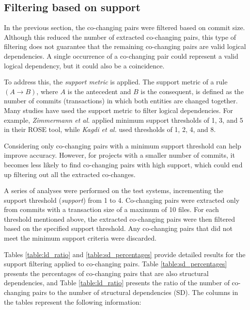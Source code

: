 \subsection{Filtering based on support}
\label{subsec:filtering_support}

\hspace{4em}In the previous section, the co-changing pairs were filtered based on commit size. Although this reduced the number of extracted co-changing pairs, this type of filtering does not guarantee that the remaining co-changing pairs are valid logical dependencies. A single occurrence of a co-changing pair could represent a valid logical dependency, but it could also be a coincidence.  

To address this, the \textit{support metric} is applied. The support metric of a rule $(A \rightarrow B)$, where $A$ is the antecedent and $B$ is the consequent, is defined as the number of commits (transactions) in which both entities are changed together. Many studies have used the support metric to filter logical dependencies. For example, \textit{Zimmermann et al.} \cite{Zimmermann:2004:MVH:998675.999460} applied minimum support thresholds of 1, 3, and 5 in their ROSE tool, while \textit{Kagdi et al.} \cite{article-Kagdi-commit} used thresholds of 1, 2, 4, and 8.

Considering only co-changing pairs with a minimum support threshold can help improve accuracy. However, for projects with a smaller number of commits, it becomes less likely to find co-changing pairs with high support, which could end up filtering out all the extracted co-changes.

A series of analyses were performed on the test systems, incrementing the support threshold (\textit{support}) from 1 to 4. Co-changing pairs were extracted only from commits with a transaction size of a maximum of 10 files. For each threshold mentioned above, the extracted co-changing pairs were then filtered based on the specified support threshold. Any co-changing pairs that did not meet the minimum support criteria were discarded.


Tables \ref{table:ld_ratio} and \ref{table:sd_percentages} provide detailed results for the support filtering applied to co-changing pairs. Table \ref{table:sd_percentages} presents the percentages of co-changing pairs that are also structural dependencies, and Table \ref{table:ld_ratio} presents the ratio of the number of co-changing pairs to the number of structural dependencies (SD). The columns in the tables represent the following information:

